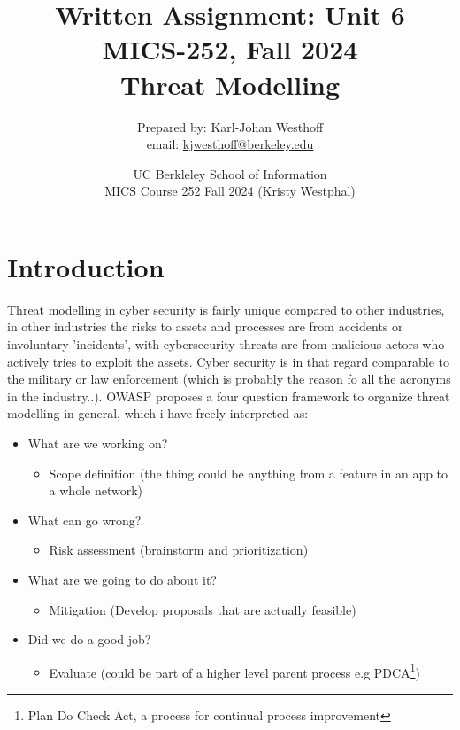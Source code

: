 \documentclass[
	letterpaper, %
	10pt, %
	unnumberedsections, %
	twoside, %
]{APAAssignment}
\title{Written Assignment: Unit 6 \\ MICS-252, Fall 2024 \\ Threat Modelling} %
\date{UC Berkleley School of Information \\
MICS Course 252 Fall 2024 (Kristy Westphal)
}
\author{
	Prepared by: Karl-Johan Westhoff \\
	email: \href{mailto:kjwesthoff@berkeley.edu}{kjwesthoff@berkeley.edu}
}
\begin{document}
\onecolumn
\maketitle %



\section{Introduction}
Threat modelling in cyber security is fairly unique compared to other industries, in other industries the risks to assets and processes are from accidents or involuntary 'incidents', with cybersecurity threats are from malicious actors who actively tries to exploit the assets. Cyber security is in that regard  comparable to the military or law enforcement (which is probably the reason fo all the acronyms in the industry..). OWASP proposes a four question framework\cite{OWASP_ThreatModellingProject} to organize threat modelling in general, which i have freely interpreted as:

\begin{itemize}
	\item What are we working on?
	\begin{itemize}
		\item Scope definition (the thing could be anything from a feature in an app to a whole network)
	\end{itemize}
	\item What can go wrong?
	\begin{itemize}
		\item Risk assessment (brainstorm and prioritization)	
	\end{itemize}
	\item What are we going to do about it?
	\begin{itemize}
		\item Mitigation (Develop proposals that are actually feasible)
	\end{itemize}
	\item Did we do a good job?
	\begin{itemize}
		\item Evaluate (could be part of a higher level parent process e.g PDCA\footnote{Plan Do Check Act, a process for continual process improvement\cite{PDCA_Wiki}})
	\end{itemize}
\end{itemize}
\end{document}
